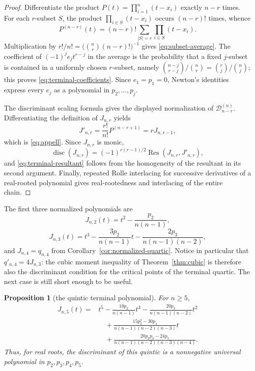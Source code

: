\documentclass[11pt]{amsart}
\numberwithin{equation}{section}
\newtheorem{proposition}[theorem]{Proposition}
\newcommand{\D}{\mathcal D}
\newcommand{\Res}{\operatorname{Res}}
\newcommand{\disc}{\operatorname{disc}}
\begin{document}
\begin{proof}
Differentiate the product $P(t)=\prod_{i=1}^n(t-x_i)$ exactly $n-r$
times.  For each $r$-subset $S$, the product
$\prod_{i\in S}(t-x_i)$ occurs $(n-r)!$ times, whence
\[
P^{(n-r)}(t)=(n-r)!\sum_{|S|=r}\prod_{i\in S}(t-x_i).
\]
Multiplication by $r!/n!=\bigl(\binom nr(n-r)!\bigr)^{-1}$ gives
\eqref{eq:subset-average}.  The coefficient of $(-1)^je_jt^{r-j}$ in
the average is the probability that a fixed $j$-subset is contained in a
uniformly chosen $r$-subset, namely
$\binom{n-j}{r-j}/\binom nr=\binom rj/\binom nj$; this proves
\eqref{eq:terminal-coefficients}.  Since $e_1=p_1=0$, Newton's identities
express every $e_j$ as a polynomial in $p_2,\ldots,p_j$.

The discriminant scaling formula gives the displayed normalization of
$\D_{n-r}^{(n)}$.  Differentiating the definition of $J_{n,r}$ yields
\[
J'_{n,r}=\frac{r!}{n!}P^{(n-r+1)}=rJ_{n,r-1},
\]
which is \eqref{eq:appell}.  Since $J_{n,r}$ is monic,
\[
\disc(J_{n,r})=(-1)^{r(r-1)/2}\Res(J_{n,r},J'_{n,r}),
\]
and \eqref{eq:terminal-resultant} follows from the homogeneity of the
resultant in its second argument.  Finally, repeated Rolle interlacing for
successive derivatives of a real-rooted polynomial gives real-rootedness and
interlacing of the entire chain.
\end{proof}

The first three normalized polynomials are
\[
J_{n,2}(t)=t^2-\frac{p_2}{n(n-1)},
\]
\[
J_{n,3}(t)=t^3-\frac{3p_2}{n(n-1)}t
-\frac{2p_3}{n(n-1)(n-2)},
\]
and $J_{n,4}=q_{n,4}$ from Corollary~\ref{cor:normalized-quartic}.  Notice in
particular that $q'_{n,4}=4J_{n,3}$: the cubic moment inequality of
Theorem~\ref{thm:cubic} is therefore also the discriminant condition for the
critical points of the terminal quartic.  The next case is still short enough
to be useful.

\begin{proposition}[the quintic terminal polynomial]\label{prop:quintic-terminal}
For $n\ge5$,
\[
\begin{aligned}
J_{n,5}(t)={}&t^5-\frac{10p_2}{n(n-1)}t^3
-\frac{20p_3}{n(n-1)(n-2)}t^2\\
&\quad+\frac{15p_2^2-30p_4}{n(n-1)(n-2)(n-3)}t\\
&\quad+\frac{20p_2p_3-24p_5}
{n(n-1)(n-2)(n-3)(n-4)} .
\end{aligned}
\]
Thus, for real roots, the discriminant of this quintic is a nonnegative
universal polynomial in $p_2,p_3,p_4,p_5$.
\end{proposition}
\end{document}
